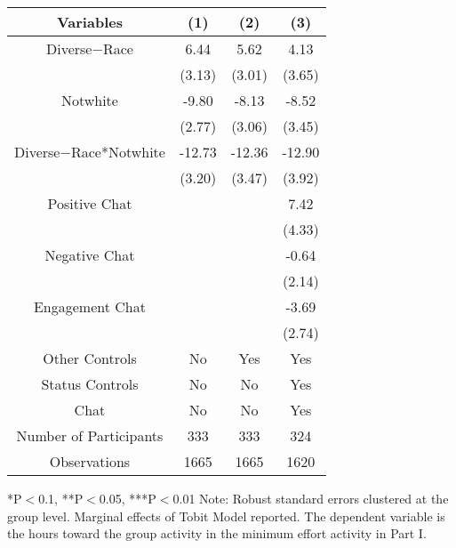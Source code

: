\begin{table}[htbp]
    \begin{tabular}{c c c c}
    \toprule
    \textbf{Variables} & \textbf{(1)} & \textbf{(2)} & \textbf{(3)}       \\ 
\midrule
Diverse$-$Race        &     6.44\sym{**}                   &    5.62\sym{*}                   &  4.13 \\
                      &     (3.13)                 &     (3.01)                &  (3.65) \\
Notwhite           &      -9.80\sym{***}     &    -8.13\sym{***}      &  -8.52\sym{***}     \\
                      &      (2.77)              &    (3.06)                   &  (3.45) \\
Diverse$-$Race*Notwhite  &      -12.73\sym{***}   &  -12.36\sym{***}      &  -12.90\sym{***}\\
                            &      (3.20)               &    (3.47)              &  (3.92) \\

Positive Chat                        &                     &                       &  7.42\sym{*}  \\
                                 &                     &                           &  (4.33)  \\
Negative  Chat                       &                     &                       &  -0.64  \\
                                 &                     &                           &  (2.14)  \\
Engagement Chat                      &                     &                       &  -3.69  \\
                                 &                     &                           &  (2.74)  \\
\midrule
Other Controls                   &    No               &    Yes                    &    Yes        \\
Status Controls                    &    No               &    No                   &    Yes        \\
Chat                             &    No               &    No                     &    Yes        \\
\midrule
Number of Participants           &    333               &    333                   &    324        \\
\midrule
Observations                     &       1665          &       1665                &  1620    \\
\bottomrule

\end{tabular}
\begin{footnotesize}
\newline
*P$<$0.1, **P$<$0.05, ***P$<$0.01
\newline
Note: Robust standard errors clustered at the group level. Marginal effects of Tobit Model reported. 
\newline
The dependent variable is the hours toward the group activity in the minimum effort activity in Part I.\end{footnotesize}
\end{table}